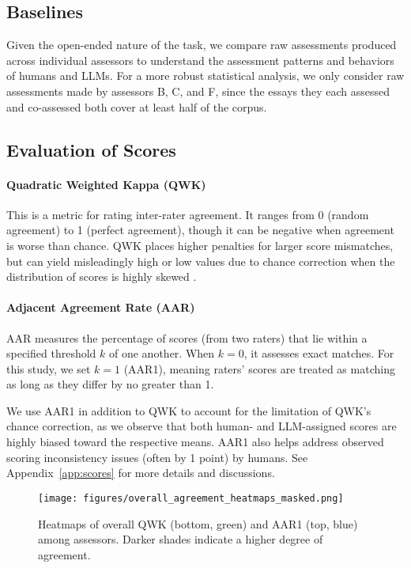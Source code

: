 \subsection{Baselines}

Given the open-ended nature of the task, we compare raw assessments produced across individual assessors to understand the assessment patterns and behaviors of humans and LLMs. For a more robust statistical analysis, we only consider raw assessments made by assessors B, C, and F, since the essays they each assessed and co-assessed both cover at least half of the corpus. 



\subsection{Evaluation of Scores\label{sec:evalOfScores}} 




\paragraph{Quadratic Weighted Kappa (QWK)} This is a metric for rating inter-rater agreement. It ranges from 0 (random agreement) to 1 (perfect agreement), though it can be negative when agreement is worse than chance. QWK places higher penalties for larger score mismatches, but can yield misleadingly high or low values due to chance correction when the distribution of scores is highly skewed \citep{yannakoudakis-cummins-2015-evaluating}. 


\paragraph{Adjacent Agreement Rate (AAR)} AAR measures the percentage of scores (from two raters) that lie within a specified threshold $k$ of one another. When $k=0$, it assesses exact matches. For this study, we set $k=1$ (AAR1), meaning raters' scores are treated as matching as long as they differ by no greater than 1.

We use AAR1 in addition to QWK to account for the limitation of QWK's chance correction, as we observe that both human- and LLM-assigned scores are highly biased toward the respective means. AAR1 also helps address observed scoring inconsistency issues (often by 1 point) by humans. See Appendix~\ref{app:scores} for more details and discussions.




\begin{figure}
    \centering
    \texttt{[image: figures/overall\_agreement\_heatmaps\_masked.png]}
    \caption{Heatmaps of overall QWK (bottom, green) and AAR1 (top, blue) among assessors. Darker shades indicate a higher degree of agreement.}    \label{fig:overall_agreement_heatmap}
\end{figure}



